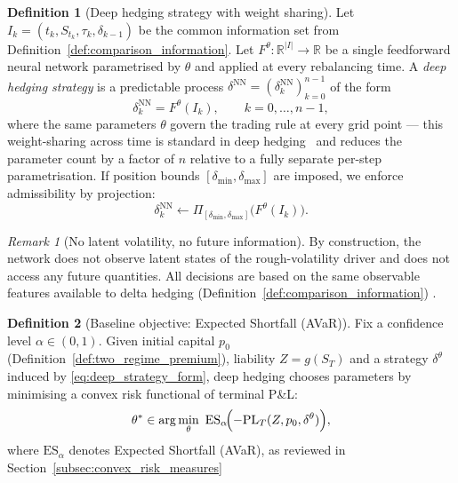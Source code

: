 \documentclass[12pt,a4paper]{article}
\theoremstyle{definition}
\newtheorem{definition}{Definition}[section]
\theoremstyle{plain}
\theoremstyle{remark}
\newtheorem{remark}{Remark}[section]
\theoremstyle{plain}
\begin{document}
\label{subsubsec:deep_strategy_class}

\begin{definition}[Deep hedging strategy with weight sharing]\label{def:deep_strategy_class}
Let $I_k=(t_k,S_{t_k},\tau_k,\delta_{k-1})$ be the common information set from Definition~\ref{def:comparison_information}.
Let $F^\theta : \mathbb{R}^{|I|} \to \mathbb{R}$ be a single feedforward neural network parametrised by $\theta$ and applied at every rebalancing time. A \emph{deep hedging strategy} is a predictable process $\delta^{\mathrm{NN}}=(\delta_k^{\mathrm{NN}})_{k=0}^{n-1}$ of the form
\begin{equation}
\label{eq:deep_strategy_form}
\delta_k^{\mathrm{NN}} = F^\theta(I_k),
\qquad k=0,\dots,n-1,
\end{equation}
where the same parameters $\theta$ govern the trading rule at every grid point --- this weight-sharing across time is standard in deep hedging~\cite{Buehler2019DeepHedging} and reduces the parameter count by a factor of $n$ relative to a fully separate per-step parametrisation.
If position bounds $[\delta_{\min},\delta_{\max}]$ are imposed, we enforce admissibility by projection:
\[
\delta_k^{\mathrm{NN}} \leftarrow \Pi_{[\delta_{\min},\delta_{\max}]}\!\bigl(F^\theta(I_k)\bigr).
\]
\end{definition}

\begin{remark}[No latent volatility, no future information]
\label{rem:nn_no_latent_no_future}
By construction, the network does not observe latent states of the rough-volatility driver and does not access any future quantities.
All decisions are based on the same observable features available to delta hedging (Definition~\ref{def:comparison_information}) \cite{Buehler2019DeepHedging,Horvath2021DeepRough}.
\end{remark}

\label{subsubsec:deep_objective}

\begin{definition}[Baseline objective: Expected Shortfall (AVaR)]
\label{def:deep_objective_es}
Fix a confidence level $\alpha\in(0,1)$.
Given initial capital $p_0$ (Definition~\ref{def:two_regime_premium}), liability $Z=g(S_T)$ and a strategy $\delta^\theta$ induced by \eqref{eq:deep_strategy_form},
deep hedging chooses parameters by minimising a convex risk functional of terminal P\&L:
\begin{equation}
\label{eq:deep_es_objective}
\theta^\ast \in \arg\min_{\theta}\ \mathrm{ES}_{\alpha}\!\Bigl(-\mathrm{PL}_T(Z,p_0,\delta^\theta)\Bigr),
\end{equation}
where $\mathrm{ES}_{\alpha}$ denotes Expected Shortfall (AVaR), as reviewed in Section~\ref{subsec:convex_risk_measures} \cite{FoellmerSchied2016,Buehler2019DeepHedging}
\end{definition}
\end{document}
